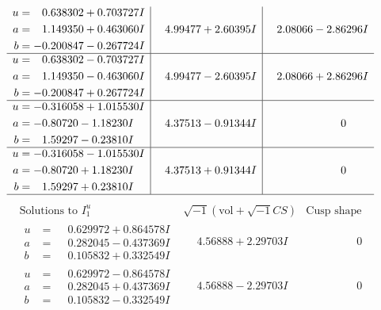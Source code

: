 \documentclass[1p]{elsarticle_modified}
\theoremstyle{definition}
\newcommand{\I}{\sqrt{-1}}
\begin{document}
$$\begin{array}{c|c|c}
\begin{aligned}
u &= \phantom{-}0.638302 + 0.703727 I \\
a &= \phantom{-}1.149350 + 0.463060 I \\
b &= -0.200847 - 0.267724 I\end{aligned}
 & \phantom{-}4.99477 + 2.60395 I & \phantom{-}2.08066 - 2.86296 I \\ \hline\begin{aligned}
u &= \phantom{-}0.638302 - 0.703727 I \\
a &= \phantom{-}1.149350 - 0.463060 I \\
b &= -0.200847 + 0.267724 I\end{aligned}
 & \phantom{-}4.99477 - 2.60395 I & \phantom{-}2.08066 + 2.86296 I \\ \hline\begin{aligned}
u &= -0.316058 + 1.015530 I \\
a &= -0.80720 - 1.18230 I \\
b &= \phantom{-}1.59297 - 0.23810 I\end{aligned}
 & \phantom{-}4.37513 - 0.91344 I & \phantom{-0.000000 } 0 \\ \hline\begin{aligned}
u &= -0.316058 - 1.015530 I \\
a &= -0.80720 + 1.18230 I \\
b &= \phantom{-}1.59297 + 0.23810 I\end{aligned}
 & \phantom{-}4.37513 + 0.91344 I & \phantom{-0.000000 } 0\\
 \hline 
 \end{array}$$\newpage$$\begin{array}{c|c|c}  
\text{Solutions to }I^u_{1}& \I (\text{vol} + \sqrt{-1}CS) & \text{Cusp shape}\\
 \hline 
\begin{aligned}
u &= \phantom{-}0.629972 + 0.864578 I \\
a &= \phantom{-}0.282045 - 0.437369 I \\
b &= \phantom{-}0.105832 + 0.332549 I\end{aligned}
 & \phantom{-}4.56888 + 2.29703 I & \phantom{-0.000000 } 0 \\ \hline\begin{aligned}
u &= \phantom{-}0.629972 - 0.864578 I \\
a &= \phantom{-}0.282045 + 0.437369 I \\
b &= \phantom{-}0.105832 - 0.332549 I\end{aligned}
 & \phantom{-}4.56888 - 2.29703 I & \phantom{-0.000000 } 0 \\ \hline\begin{aligned}

\end{aligned}
\end{array}$$
\end{document}
